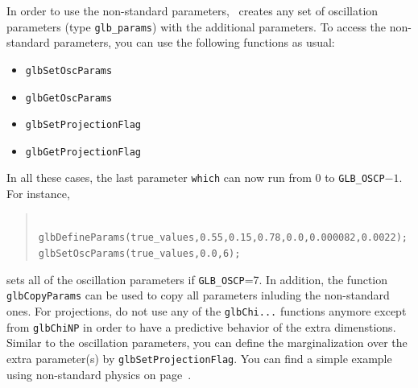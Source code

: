 In order to use the non-standard parameters, \GLOBES\ creates any set of oscillation parameters (type {\tt glb\_params})
with the additional parameters. To access the non-standard parameters, you can use the following functions as usual:
\begin{itemize}
\item
{\tt glbSetOscParams}
\item
{\tt glbGetOscParams}
\item
{\tt glbSetProjectionFlag}
\item
{\tt glbGetProjectionFlag}
\end{itemize}
In all these cases, the last parameter {\tt which} can now run from $0$ to {\tt GLB\_OSCP}$-1$. For instance,
\begin{quote}
{\tt
 glbDefineParams(true\_values,0.55,0.15,0.78,0.0,0.000082,0.0022); \\
 glbSetOscParams(true\_values,0.0,6);
}
\end{quote}
sets all of the oscillation parameters if {\tt GLB\_OSCP}=7. In addition, the function {\tt glbCopyParams}
can be used to copy all parameters inluding the non-standard ones. For projections,
do not use any of the {\tt glbChi...} functions anymore except from {\tt glbChiNP} in order to have a
predictive behavior of the extra dimenstions. Similar to the oscillation parameters, you can define
the marginalization over the extra parameter(s) by {\tt glbSetProjectionFlag}. You can find a simple
example using non-standard physics on page~\pageref{ex:nsphysics}.

